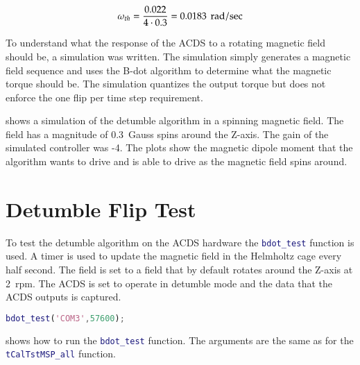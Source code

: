 \begin{equation}
    \omega _ {th} = { 0.022 \over{ {4 \cdot 0.3}}} = 0.0183 ~ \, \mathrm{rad / sec}
\end{equation}

To understand what the response of the \ac{ACDS} to a rotating magnetic field should be, a simulation was written. The simulation simply generates a magnetic field sequence and uses the B-dot algorithm to determine what the magnetic torque should be. The simulation quantizes the output torque but does not enforce the one flip per time step requirement.


 shows a simulation of the detumble algorithm in a spinning magnetic field. The field has a magnitude of 0.3~Gauss spins around the Z-axis. The gain of the simulated controller was -4. The plots show the magnetic dipole moment that the algorithm wants to drive and is able to drive as the magnetic field spins around.


\section{Detumble Flip Test}

To test the detumble algorithm on the \ac{ACDS} hardware the \lstinline[style=code,language=Matlab]$bdot_test$ function is used. A timer is used to update the magnetic field in the Helmholtz cage every half second. The field is set to a field that by default rotates around the Z-axis at 2~rpm. The \ac{ACDS} is set to operate in detumble mode and the data that the \ac{ACDS} outputs is captured.

\begin{lstlisting}[style=code,caption={Testing B-dot},label={lst:MSP-bdot},language=Matlab]
bdot_test('COM3',57600);
\end{lstlisting}

 shows how to run the \lstinline[style=code,language=Matlab]$bdot_test$ function. The arguments are the same as for the \lstinline[style=code,language=Matlab]$tCalTstMSP_all$ function.


